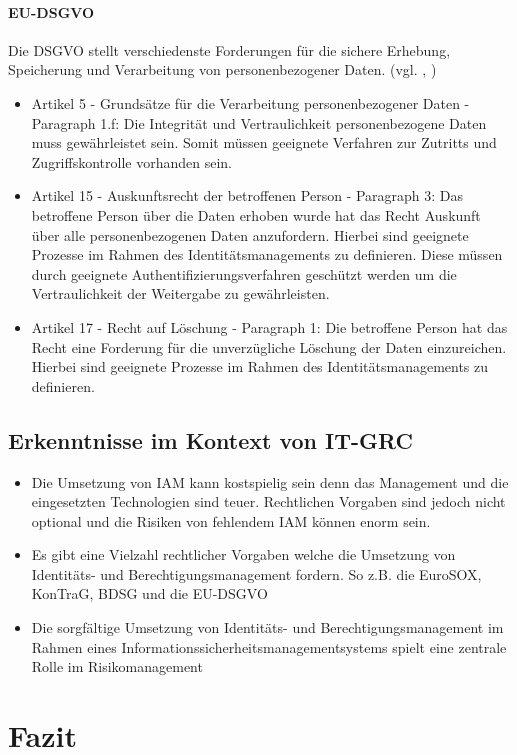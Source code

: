 \documentclass[11pt]{article}
\begin{document}
\paragraph{EU-DSGVO}
Die DSGVO stellt verschiedenste Forderungen für die sichere Erhebung, Speicherung und Verarbeitung von personenbezogener Daten. (vgl. \cite{Hindle_2020}, \cite{eu2016})
\begin{itemize}
  \item Artikel 5 - Grundsätze für die Verarbeitung personenbezogener Daten - Paragraph 1.f: Die Integrität und Vertraulichkeit personenbezogene Daten muss gewährleistet sein. Somit müssen geeignete Verfahren zur Zutritts und Zugriffskontrolle vorhanden sein.
  \item Artikel 15 - Auskunftsrecht der betroffenen Person - Paragraph 3: Das betroffene Person über die Daten erhoben wurde hat das Recht Auskunft über alle personenbezogenen Daten anzufordern. Hierbei sind geeignete Prozesse im Rahmen des Identitätsmanagements zu definieren. Diese müssen durch geeignete Authentifizierungsverfahren geschützt werden um die Vertraulichkeit der Weitergabe zu gewährleisten.
  \item Artikel 17 - Recht auf Löschung - Paragraph 1: Die betroffene Person hat das Recht eine Forderung für die unverzügliche Löschung der Daten einzureichen. Hierbei sind geeignete Prozesse im Rahmen des Identitätsmanagements zu definieren.
\end{itemize}
\subsection{Erkenntnisse im Kontext von IT-GRC}
\begin{itemize}
  \item Die Umsetzung von IAM kann kostspielig sein denn das Management und die eingesetzten Technologien sind teuer. Rechtlichen Vorgaben sind jedoch nicht optional und die Risiken von fehlendem IAM können enorm sein.
  \item Es gibt eine Vielzahl rechtlicher Vorgaben welche die Umsetzung von Identitäts- und Berechtigungsmanagement fordern. So z.B. die EuroSOX, KonTraG, BDSG und die EU-DSGVO
  \item Die sorgfältige Umsetzung von Identitäts- und Berechtigungsmanagement im Rahmen eines Informationssicherheitsmanagementsystems spielt eine zentrale Rolle im Risikomanagement
\end{itemize}
\section{Fazit}
\end{document}
